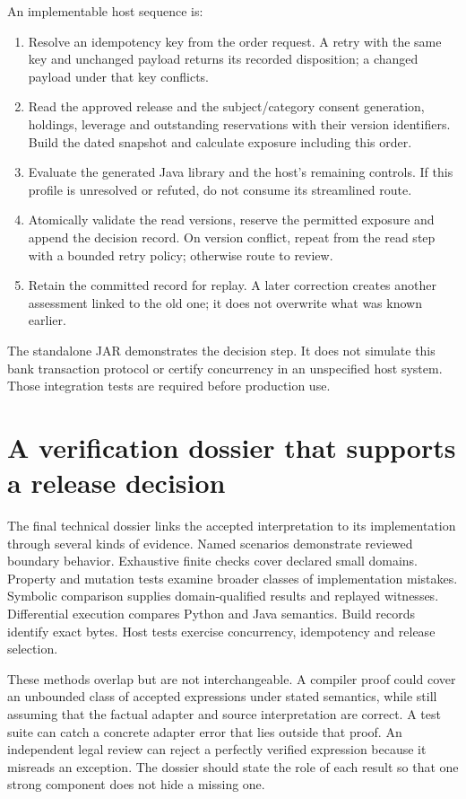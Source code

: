 \documentclass[12pt,a4paper,oneside,openany]{book}
\begin{document}
An implementable host sequence is:
\begin{enumerate}
\item Resolve an idempotency key from the order request. A retry with the same
key and unchanged payload returns its recorded disposition; a changed payload
under that key conflicts.
\item Read the approved release and the subject/category consent generation,
holdings, leverage and outstanding reservations with their version identifiers.
Build the dated snapshot and calculate exposure including this order.
\item Evaluate the generated Java library and the host's remaining controls.
If this profile is unresolved or refuted, do not consume its streamlined route.
\item Atomically validate the read versions, reserve the permitted exposure and
append the decision record. On version conflict, repeat from the read step with
a bounded retry policy; otherwise route to review.
\item Retain the committed record for replay. A later correction creates another
assessment linked to the old one; it does not overwrite what was known earlier.
\end{enumerate}
The standalone JAR demonstrates the decision step. It does not simulate this
bank transaction protocol or certify concurrency in an unspecified host system.
Those integration tests are required before production use.

\section{A verification dossier that supports a release decision}
\label{merge:M07:14}


The final technical dossier links the accepted interpretation to its implementation
through several kinds of evidence. Named scenarios demonstrate reviewed boundary
behavior. Exhaustive finite checks cover declared small domains. Property and
mutation tests examine broader classes of implementation mistakes. Symbolic
comparison supplies domain-qualified results and replayed witnesses. Differential
execution compares Python and Java semantics. Build records identify exact bytes.
Host tests exercise concurrency, idempotency and release selection.

These methods overlap but are not interchangeable. A compiler proof could cover
an unbounded class of accepted expressions under stated semantics, while still
assuming that the factual adapter and source interpretation are correct. A test
suite can catch a concrete adapter error that lies outside that proof. An
independent legal review can reject a perfectly verified expression because it
misreads an exception. The dossier should state the role of each result so that
one strong component does not hide a missing one.
\end{document}
